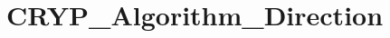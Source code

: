 \hypertarget{group___c_r_y_p___algorithm___direction}{\section{C\-R\-Y\-P\-\_\-\-Algorithm\-\_\-\-Direction}
\label{group___c_r_y_p___algorithm___direction}
}
